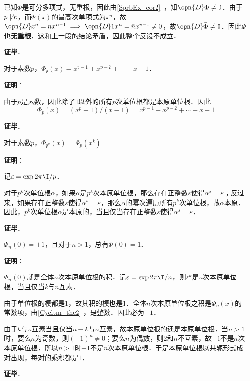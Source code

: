 已知$\Phi$是可分多项式，无重根，因此由\autoref{SprbEx_cor2}~，知$\opn{D}\Phi\neq 0$．由于$p\not\mid n$，而$\Phi(x)$的最高次单项式为$x^n$，故$\opn{D}x^n=nx^{n-1}\implies \opn{D} \bar{1}x^n=\bar{n}x^{n-1}\neq 0$，故$\opn{D}\bar{\Phi}\neq 0$．因此$\bar{\Phi}$也\textbf{无重根}．这和上一段的结论矛盾，因此整个反设不成立．

\textbf{证毕}．



\begin{theorem}{}
对于素数$p$，$\Phi_p(x)=x^{p-1}+x^{p-2}+\cdots+x+1$．
\end{theorem}

\textbf{证明}：

由于$p$是素数，因此除了$1$以外的所有$p$次单位根都是本原单位根．因此
\begin{equation}
\Phi_p(x) = (x^p-1)/(x-1) = x^{p-1}+x^{p-2}+\cdots+x+1
\end{equation}

\textbf{证毕}．



\begin{theorem}{}
对于素数$p$，$\Phi_{p^k}(x) = \Phi_p(x^{k})$
\end{theorem}

\textbf{证明}：

记$\varepsilon=\exp{2\pi\I/p}$．

对于$p^k$次单位根$\alpha$，如果$\alpha$是$p^k$次本原单位根，那么存在正整数$s$使得$\alpha^s=\varepsilon$；反过来，如果存在正整数$s$使得$\alpha^s=\varepsilon$，那么$\alpha$的幂次遍历所有$p^k$次单位根，故$\alpha$本原．因此，$p^k$次单位根$\alpha$是本原的，当且仅当存在正整数$s$使得$\alpha^s=\varepsilon$．



\textbf{证毕}．











\begin{theorem}{}
$\Phi_n(0)=\pm 1$，且对于$n>1$，总有$\Phi(0)=1$．
\end{theorem}

\textbf{证明}：

$\Phi_n(0)$就是全体$n$次本原单位根的积．记$\varepsilon=\exp{2\pi\I/n}$，则$\varepsilon^k$是$n$次本原单位根，当且仅当$k$与$n$互素．

由于单位根的模都是$1$，故其积的模也是$1$．全体$n$次本原单位根之积是$\Phi_n(x)$的常数项，由\autoref{Cycltm_the2} ，是整数．因此必为$\pm 1$．

由于$k$与$n$互素当且仅当$n-k$与$n$互素，故本原单位根的还是本原单位根．当$n>1$时，要么$n$为奇数，则$(-1)^n\neq 0$；要么$n$为偶数，则$2$和$n$不互素，故$-1$不是$n$次本原单位根．所以$n>1$时$-1$不是$n$次本原单位根．于是本原单位根以共轭形式成对出现，每对的乘积都是$1$．

\textbf{证毕}．





























